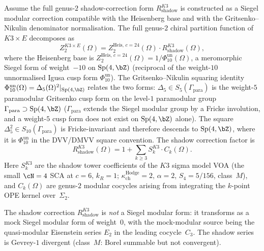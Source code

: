 \begin{theorem}
\label{conj:genus2-k3e-full}
Assume the full genus-$2$ shadow-correction form
\(R_{\mathrm{shadow}}^{K3}\) is constructed as a Siegel modular
correction compatible with the Heisenberg base and with the
Gritsenko--Nikulin denominator normalisation.
The full genus-$2$ chiral partition function of $K3 \times E$
decomposes as
\begin{equation}\label{eq:z2-k3e-full}
Z_2^{K3 \times E}(\Omega)
= Z_2^{\mathrm{Heis},\, c=24}(\Omega) \cdot R_{\mathrm{shadow}}^{K3}(\Omega),
\end{equation}
where the Heisenberg base is
\(Z_2^{\mathrm{Heis},\, c=24}(\Omega) = 1/\Phi_{10}^{\mathrm{un}}(\Omega)\),
a meromorphic Siegel form of weight~$-10$ on $\mathrm{Sp}(4,\bZ)$
\textup{(}reciprocal of the weight-$10$ unnormalised Igusa cusp form \(\Phi_{10}^{\mathrm{un}}\)\textup{)}.
The Gritsenko--Nikulin squaring identity
\(\Phi_{10}^{\mathrm{un}}(\Omega)=\Delta_5(\Omega)^2|_{\mathrm{Sp}(4,\bZ)}\)
relates the two forms: $\Delta_5 \in S_5(\Gamma_{\mathrm{para}})$ is the
weight-$5$ paramodular Gritsenko cusp form on the level-$1$ paramodular
group $\Gamma_{\mathrm{para}} \supset \mathrm{Sp}(4,\bZ)$
\textup{(}$\Gamma_{\mathrm{para}}$ extends the Siegel modular group by a
Fricke involution, and a weight-$5$ cusp form does not exist on
$\mathrm{Sp}(4,\bZ)$ alone\textup{)}. The square
$\Delta_5^2 \in S_{10}(\Gamma_{\mathrm{para}})$ is Fricke-invariant and
therefore descends to $\mathrm{Sp}(4,\bZ)$, where it is
\(\Phi_{10}^{\mathrm{un}}\) in the DVV/DMVV square convention. The shadow
correction factor is
\begin{equation}\label{eq:r-shadow-k3}
R_{\mathrm{shadow}}^{K3}(\Omega) = 1 + \sum_{k \geq 3} S_k^{K3} \cdot C_k(\Omega).
\end{equation}
Here $S_k^{K3}$ are the shadow tower coefficients of the $K3$ sigma
model VOA \textup{(}the small $\cN = 4$ SCA at $c = 6$, $k_R = 1$;
$\kappa_{\mathrm{ch}}^{\mathrm{Hodge}} = 2$, $\alpha = 2$, $S_4 = 5/156$, class~$M$\textup{)},
and $C_k(\Omega)$ are genus-$2$ modular cocycles arising from integrating
the $k$-point OPE kernel over~$\Sigma_2$.

The shadow correction $R_{\mathrm{shadow}}^{K3}$ is \emph{not} a Siegel
modular form: it transforms as a mock Siegel modular form of weight~$0$,
with the mock-modular source being the quasi-modular Eisenstein series $E_2$
in the leading cocycle~$C_3$. The shadow series is Gevrey-$1$ divergent
\textup{(}class~$M$: Borel summable but not convergent\textup{)}.


\end{theorem}
